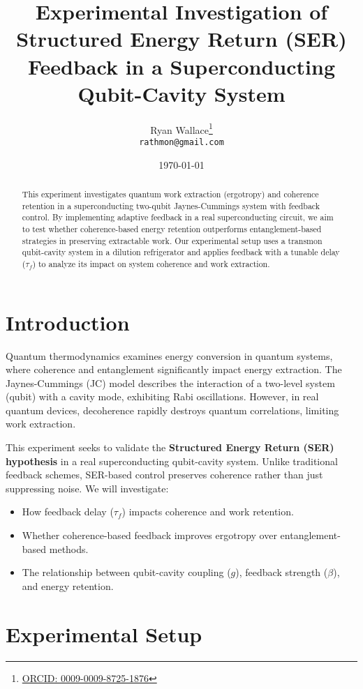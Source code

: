 \documentclass[a4paper,12pt]{article}
\title{Experimental Investigation of Structured Energy Return (SER) Feedback in a Superconducting Qubit-Cavity System}
\author{Ryan Wallace\thanks{\href{https://orcid.org/0009-0009-8725-1876}{ORCID: 0009-0009-8725-1876}} \\ 
\texttt{rathmon@gmail.com}}
\date{\today}
\begin{document}
\maketitle

\begin{abstract}
This experiment investigates quantum work extraction (ergotropy) and coherence retention in a superconducting two-qubit Jaynes-Cummings system with feedback control. By implementing adaptive feedback in a real superconducting circuit, we aim to test whether coherence-based energy retention outperforms entanglement-based strategies in preserving extractable work. Our experimental setup uses a transmon qubit-cavity system in a dilution refrigerator and applies feedback with a tunable delay (\(\tau_f\)) to analyze its impact on system coherence and work extraction.
\end{abstract}

\section{Introduction}
Quantum thermodynamics examines energy conversion in quantum systems, where coherence and entanglement significantly impact energy extraction. The Jaynes-Cummings (JC) model describes the interaction of a two-level system (qubit) with a cavity mode, exhibiting Rabi oscillations. However, in real quantum devices, decoherence rapidly destroys quantum correlations, limiting work extraction.

This experiment seeks to validate the \textbf{Structured Energy Return (SER) hypothesis} in a real superconducting qubit-cavity system. Unlike traditional feedback schemes, SER-based control preserves coherence rather than just suppressing noise. We will investigate:
\begin{itemize}
    \item How feedback delay (\(\tau_f\)) impacts coherence and work retention.
    \item Whether coherence-based feedback improves ergotropy over entanglement-based methods.
    \item The relationship between qubit-cavity coupling (\(g\)), feedback strength (\(\beta\)), and energy retention.
\end{itemize}

\section{Experimental Setup}
\end{document}

